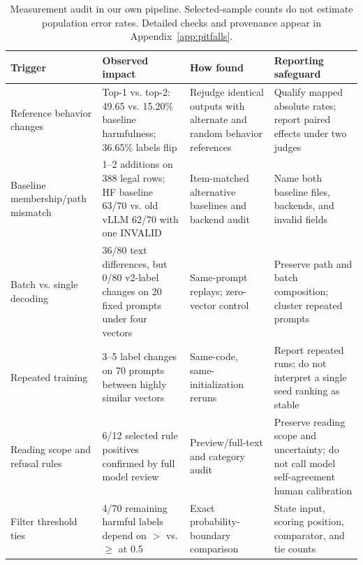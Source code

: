 \begin{table}[t]
\small
\centering
\begin{tabular}{p{}p{}p{}p{}}
\toprule
Trigger & Observed impact & How found & Reporting safeguard \\
\midrule
Reference behavior changes & Top-1 vs. top-2: 49.65 vs. 15.20\% baseline harmfulness; 36.65\% labels flip & Rejudge identical outputs with alternate and random behavior references & Qualify mapped absolute rates; report paired effects under two judges \\
Baseline membership/path mismatch & 1--2 additions on 388 legal rows; HF baseline 63/70 vs. old vLLM 62/70 with one INVALID & Item-matched alternative baselines and backend audit & Name both baseline files, backends, and invalid fields \\
Batch vs. single decoding & 36/80 text differences, but 0/80 v2-label changes on 20 fixed prompts under four vectors & Same-prompt replays; zero-vector control & Preserve path and batch composition; cluster repeated prompts \\
Repeated training & 3--5 label changes on 70 prompts between highly similar vectors & Same-code, same-initialization reruns & Report repeated runs; do not interpret a single seed ranking as stable \\
Reading scope and refusal rules & 6/12 selected rule positives confirmed by full model review & Preview/full-text and category audit & Preserve reading scope and uncertainty; do not call model self-agreement human calibration \\
Filter threshold ties & 4/70 remaining harmful labels depend on $>$ vs. $\geq$ at 0.5 & Exact probability-boundary comparison & State input, scoring position, comparator, and tie counts \\
\bottomrule
\end{tabular}
\caption{Measurement audit in our own pipeline. Selected-sample counts do not estimate population error rates. Detailed checks and provenance appear in Appendix~\ref{app:pitfalls}.}
\label{tab:measurement-checklist}
\end{table}
